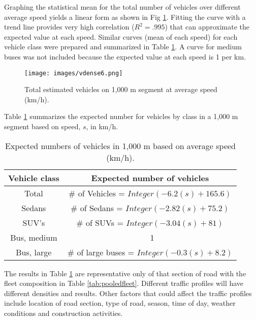\documentclass[preprint,12pt,a4paper]{elsarticle}
\begin{document}
\begin{linenumbers}
Graphing the statistical mean for the total number of vehicles over different average speed yields a linear form as shown in Fig \ref{fig9:estimateavemix}.  Fitting the curve with a trend line provides very high correlation ($R^{2} = .995$) that can approximate the expected value at each speed.  Similar curves (mean of each speed) for each vehicle class were prepared and summarized in Table \ref{tb4:expectedvehicles}.  A curve for medium buses was not included because the expected value at each speed is 1 per km.

%
\begin{figure}[H]
\texttt{[image: images/vdense6.png]}
\caption{Total estimated vehicles on 1,000 m segment at average speed (km/h).}
\label{fig9:estimateavemix}
\end{figure}
% 

Table \ref{tb4:expectedvehicles} summarizes the expected number for vehicles by class in a 1,000 m segment based on speed, $s$, in km/h.
%
\begin{table}[H]
\centering
\caption{ Expected numbers of vehicles in 1,000 m based on average speed (km/h).}
\label{tb4:expectedvehicles}
\begin{tabular}{@{}cc@{}}
\toprule
\textbf{Vehicle class} & \textbf{Expected number of vehicles } \\ \midrule
Total & \# of Vehicles = $Integer(-6.2(s) + 165.6)$ \\
Sedans & \# of Sedans = $Integer (-2.82(s) + 75.2)$ \\
SUV's & \# of SUVs = $Integer (-3.04(s) + 81)$ \\
Bus, medium & \ 1 \\
Bus, large & \# of large buses = $Integer (-0.3(s) + 8.2)$ \\ \bottomrule
\end{tabular}
\end{table}
%
The results in Table \ref{tb4:expectedvehicles} are representative only of that section of road with the fleet composition in Table \ref{tab:pooledfleet}.  Different traffic profiles will have different densities and results.  Other factors that could affect the traffic profiles include location of road section, type of road, season, time of day, weather conditions and construction activities. 
 

\end{linenumbers}
\end{document}
